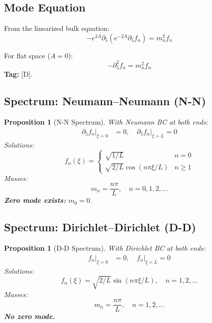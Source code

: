 \documentclass[11pt,a4paper]{article}
\newtheorem{proposition}[theorem]{Proposition}
\begin{document}
\subsection{Mode Equation}

From the linearized bulk equation:
\begin{equation}
  \boxed{-e^{2A} \partial_5 (e^{-2A} \partial_5 f_n) = m_n^2 f_n}
  \label{eq:mode-equation}
\end{equation}

For flat space ($A = 0$):
\begin{equation}
  -\partial_5^2 f_n = m_n^2 f_n
  \label{eq:mode-flat}
\end{equation}
\textbf{Tag:} [D].

\subsection{Spectrum: Neumann--Neumann (N-N)}

\begin{proposition}[N-N Spectrum]
\label{prop:nn-spectrum}
With Neumann BC at both ends:
\begin{align}
  \partial_5 f_n|_{\xi=0} &= 0, \quad \partial_5 f_n|_{\xi=L} = 0
  \label{eq:nn-bc}
\end{align}
Solutions:
\begin{equation}
  f_n(\xi) = \begin{cases}
    \sqrt{1/L} & n = 0 \\
    \sqrt{2/L} \cos(n\pi\xi/L) & n \geq 1
  \end{cases}
  \label{eq:nn-modes}
\end{equation}
Masses:
\begin{equation}
  \boxed{m_n = \frac{n\pi}{L}, \quad n = 0, 1, 2, \ldots}
  \label{eq:nn-masses}
\end{equation}
\textbf{Zero mode exists:} $m_0 = 0$.
\end{proposition}

\subsection{Spectrum: Dirichlet--Dirichlet (D-D)}

\begin{proposition}[D-D Spectrum]
\label{prop:dd-spectrum}
With Dirichlet BC at both ends:
\begin{align}
  f_n|_{\xi=0} &= 0, \quad f_n|_{\xi=L} = 0
  \label{eq:dd-bc}
\end{align}
Solutions:
\begin{equation}
  f_n(\xi) = \sqrt{2/L} \sin(n\pi\xi/L), \quad n = 1, 2, \ldots
  \label{eq:dd-modes}
\end{equation}
Masses:
\begin{equation}
  \boxed{m_n = \frac{n\pi}{L}, \quad n = 1, 2, \ldots}
  \label{eq:dd-masses}
\end{equation}
\textbf{No zero mode.}
\end{proposition}
\end{document}
